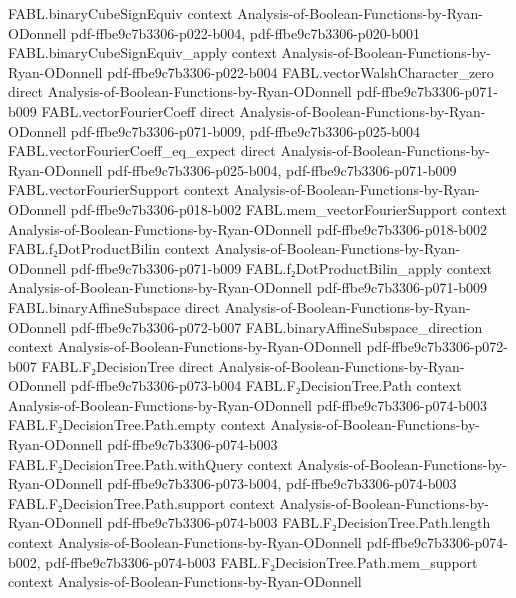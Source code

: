 \begin{theorem}
  {FABL.binaryCubeSignEquiv}
  {context}
  {Analysis-of-Boolean-Functions-by-Ryan-ODonnell}
  {pdf-ffbe9c7b3306-p022-b004,
    pdf-ffbe9c7b3306-p020-b001}
\proofstep
  {FABL.binaryCubeSignEquiv_apply}
  {context}
  {Analysis-of-Boolean-Functions-by-Ryan-ODonnell}
  {pdf-ffbe9c7b3306-p022-b004}
\proofstep
  {FABL.vectorWalshCharacter_zero}
  {direct}
  {Analysis-of-Boolean-Functions-by-Ryan-ODonnell}
  {pdf-ffbe9c7b3306-p071-b009}
\proofstep
  {FABL.vectorFourierCoeff}
  {direct}
  {Analysis-of-Boolean-Functions-by-Ryan-ODonnell}
  {pdf-ffbe9c7b3306-p071-b009,
    pdf-ffbe9c7b3306-p025-b004}
\proofstep
  {FABL.vectorFourierCoeff_eq_expect}
  {direct}
  {Analysis-of-Boolean-Functions-by-Ryan-ODonnell}
  {pdf-ffbe9c7b3306-p025-b004,
    pdf-ffbe9c7b3306-p071-b009}
\proofstep
  {FABL.vectorFourierSupport}
  {context}
  {Analysis-of-Boolean-Functions-by-Ryan-ODonnell}
  {pdf-ffbe9c7b3306-p018-b002}
\proofstep
  {FABL.mem_vectorFourierSupport}
  {context}
  {Analysis-of-Boolean-Functions-by-Ryan-ODonnell}
  {pdf-ffbe9c7b3306-p018-b002}
\proofstep
  {FABL.f₂DotProductBilin}
  {context}
  {Analysis-of-Boolean-Functions-by-Ryan-ODonnell}
  {pdf-ffbe9c7b3306-p071-b009}
\proofstep
  {FABL.f₂DotProductBilin_apply}
  {context}
  {Analysis-of-Boolean-Functions-by-Ryan-ODonnell}
  {pdf-ffbe9c7b3306-p071-b009}
\proofstep
  {FABL.binaryAffineSubspace}
  {direct}
  {Analysis-of-Boolean-Functions-by-Ryan-ODonnell}
  {pdf-ffbe9c7b3306-p072-b007}
\proofstep
  {FABL.binaryAffineSubspace_direction}
  {context}
  {Analysis-of-Boolean-Functions-by-Ryan-ODonnell}
  {pdf-ffbe9c7b3306-p072-b007}
\proofstep
  {FABL.F₂DecisionTree}
  {direct}
  {Analysis-of-Boolean-Functions-by-Ryan-ODonnell}
  {pdf-ffbe9c7b3306-p073-b004}
\proofstep
  {FABL.F₂DecisionTree.Path}
  {context}
  {Analysis-of-Boolean-Functions-by-Ryan-ODonnell}
  {pdf-ffbe9c7b3306-p074-b003}
\proofstep
  {FABL.F₂DecisionTree.Path.empty}
  {context}
  {Analysis-of-Boolean-Functions-by-Ryan-ODonnell}
  {pdf-ffbe9c7b3306-p074-b003}
\proofstep
  {FABL.F₂DecisionTree.Path.withQuery}
  {context}
  {Analysis-of-Boolean-Functions-by-Ryan-ODonnell}
  {pdf-ffbe9c7b3306-p073-b004,
    pdf-ffbe9c7b3306-p074-b003}
\proofstep
  {FABL.F₂DecisionTree.Path.support}
  {context}
  {Analysis-of-Boolean-Functions-by-Ryan-ODonnell}
  {pdf-ffbe9c7b3306-p074-b003}
\proofstep
  {FABL.F₂DecisionTree.Path.length}
  {context}
  {Analysis-of-Boolean-Functions-by-Ryan-ODonnell}
  {pdf-ffbe9c7b3306-p074-b002,
    pdf-ffbe9c7b3306-p074-b003}
\proofstep
  {FABL.F₂DecisionTree.Path.mem_support}
  {context}
  {Analysis-of-Boolean-Functions-by-Ryan-ODonnell}

\end{theorem}
